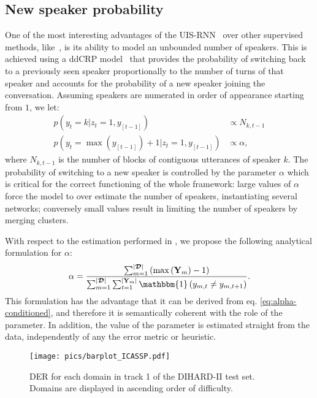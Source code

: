 \documentclass{article}
\def\Y{{\mathbf Y}}
\begin{document}
\subsection{New speaker probability}
\label{sec:crp_alpha}
One of the most interesting advantages of the UIS-RNN~\cite{zhang2019fully} over other supervised methods, like~\cite{Fujita_2019}, is its ability to model an unbounded number of speakers. This is achieved using a \ac{ddCRP} model~\cite{blei2011distance} that provides the probability of switching back to a previously seen speaker proportionally to the number of turns of that speaker and accounts for the probability of a new speaker joining the conversation. Assuming speakers are numerated in order of appearance starting from $1$, we let:
\begin{align} p\left(y_{t}=k | z_{t}=1, y_{[t-1]}\right) & \propto N_{k, t-1} \\
p\left(y_{t}=\max\left(y_{[t-1]}\right)+1 | z_{t}=1, y_{[t-1]}\right) & \propto \alpha \label{eq:alpha-conditioned}, 
\end{align}
where $N_{k, t-1}$ is the number of blocks of contiguous utterances of speaker $k$. The probability of switching to a new speaker is controlled by the parameter $\alpha$ which is critical for the correct functioning of the whole framework: large values of $\alpha$ force the model to over estimate the number of speakers, instantiating several networks; conversely small values result in limiting the number of speakers by merging clusters.

With respect to the estimation performed in \cite{zhang2019fully}, we propose the following analytical formulation for $\alpha$:
\begin{equation}
\label{eq:crp-alpha}
    \alpha = \frac{\sum_{m = 1}^{|\boldsymbol{\mathcal{D}}|} \left(\max \left( \Y_m\right) - 1\right)}{\sum_{m = 1}^{|\boldsymbol{\mathcal{D}}|}\sum_{t=1}^{|\Y_m|} \mathbbm{1}\left(y_{m,t}\neq y_{m,t+1}\right) }.
\end{equation}
This formulation has the advantage that it can be derived from eq. \ref{eq:alpha-conditioned}, and therefore it is semantically coherent with the role of the parameter. In addition, the value of the parameter is estimated straight from the data, independently of any the error metric or heuristic.

\begin{figure*}[!ht]
\centering
  \texttt{[image: pics/barplot\_ICASSP.pdf]}
  \vspace{-0.15cm}
  \caption{DER for each domain in track 1 of the DIHARD-II test set. Domains are displayed in ascending order of difficulty.}
  \vspace{-0.15cm}
\label{fig:disaggDER}
\end{figure*}
\end{document}
